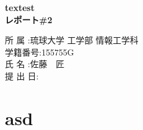 \documentclass[9pt,fleqn]{jarticle} %
\begin{document}
\begin{titlepage}
    \begin{center} %
        \fontsize{25pt}{0pt}\selectfont %
        \vspace*{100truept}
        \bf{textest}\\ %
        \vspace*{10truept}
        \bf{レポート\#2}\\ 
        \vspace{240truept}
    \end{center}
    \begin{flushright}
        {\large
            \fontsize{16pt}{0pt}\selectfont
          所  属  :琉球大学 工学部 情報工学科\\
            \vspace{5truept}
          学籍番号:155755G\\
            \vspace{5truept}
          氏  名  :佐藤　匠\\
            \vspace{5truept}
          提 出 日:\\
            \vspace{5truept}
        }    
    \end{flushright}
\end{titlepage}

\tableofcontents{\tiny} %
\setcounter{page}{1} %
\pagestyle{plain}

\newpage

\section{asd}





\begin{thebibliography}{9} 
  \bibitem{} \url{}
\end{thebibliography}
\end{document}
